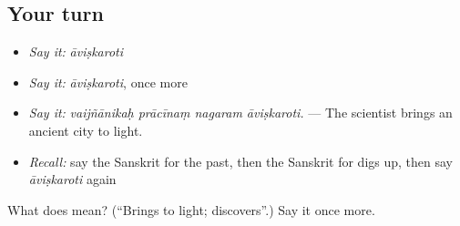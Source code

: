 \subsection*{Your turn}
\begin{itemize}
\raggedright
  \item \emph{Say it:} \emph{āviṣkaroti}
  \item \emph{Say it:} \emph{āviṣkaroti}, once more
  \item \emph{Say it:} \emph{vaijñānikaḥ prācīnaṃ nagaram āviṣkaroti.} — The scientist brings an ancient city to light.
  \item \emph{Recall:} say the Sanskrit for the past, then the Sanskrit for digs up, then say \emph{āviṣkaroti} again
\end{itemize}

\begin{tcolorbox}[breakable,colback=teal!4,colframe=teal!35!black,title={Before you move on}]
What does  mean? (\textquotedblleft{}Brings to light; discovers\textquotedblright{}.) Say it once more.
\end{tcolorbox}
